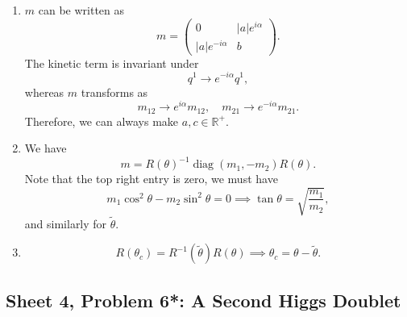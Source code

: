 \begin{solution}
    \begin{enumerate}[label=\roman*)]
        \item $m$ can be written as
        \begin{equation}
            m = \begin{pmatrix}
                0 & |a|e^{i\alpha}\\ |a| e^{-i\alpha} & b
            \end{pmatrix}.
        \end{equation}
        The kinetic term  is invariant under
        \begin{equation}
            q^1 \to e^{-i\alpha}q^1,
        \end{equation}
        whereas $m$ transforms as
        \begin{equation}
            m_{12} \to e^{i\alpha} m_{12}, \quad m_{21} \to e^{-i\alpha}m_{21}.
        \end{equation}
        Therefore, we can always make $a,c \in \mathbb{R}^+$.
        \item We have
        \begin{equation}
            m = R(\theta)^{-1}\operatorname{diag}(m_1, -m_2) R(\theta).
        \end{equation}
        Note that the top right entry is zero, we must have
        \begin{equation}
            m_1 \cos^2\theta - m_2 \sin^2 \theta = 0 \implies \tan\theta = \sqrt{\frac{m_1}{m_2}},
        \end{equation}
        and similarly for $\tilde \theta$.
        \item \begin{equation}
            R(\theta_c) = R^{-1}(\tilde \theta)R(\theta) \implies \theta_c = \theta - \tilde \theta.
        \end{equation}
    \end{enumerate}
\end{solution}

\subsection{Sheet 4, Problem 6*: A Second Higgs Doublet}

